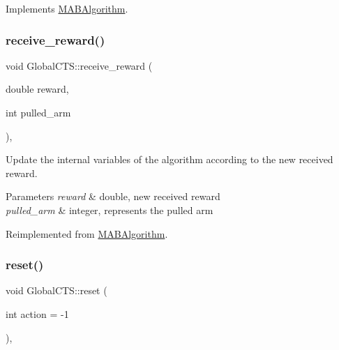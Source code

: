 Implements \mbox{\hyperlink{class_m_a_b_algorithm_afb48f01df0e1860d19759f6e20335007}{M\+A\+B\+Algorithm}}.

\mbox{\label{class_global_c_t_s_acb2f35fa8c6b2ae61912f6f337ed815f}} 
\subsubsection{\texorpdfstring{receive\+\_\+reward()}{receive\_reward()}}
{\footnotesize\ttfamily void Global\+C\+T\+S\+::receive\+\_\+reward (\begin{DoxyParamCaption}\item[{double}]{reward,  }\item[{int}]{pulled\+\_\+arm }\end{DoxyParamCaption})\hspace{0.3cm}{\ttfamily [override]}, {\ttfamily [virtual]}}



Update the internal variables of the algorithm according to the new received reward. 


\begin{DoxyParams}{Parameters}
{\em reward} & double, new received reward \\
\hline
{\em pulled\+\_\+arm} & integer, represents the pulled arm \\
\hline
\end{DoxyParams}


Reimplemented from \mbox{\hyperlink{class_m_a_b_algorithm_aa584b3d6b86fa050e3389be9781b5782}{M\+A\+B\+Algorithm}}.

\mbox{\label{class_global_c_t_s_a1e2c899b85ec7adf92a28ac758f556b5}} 
\subsubsection{\texorpdfstring{reset()}{reset()}}
{\footnotesize\ttfamily void Global\+C\+T\+S\+::reset (\begin{DoxyParamCaption}\item[{int}]{action = {\ttfamily -\/1} }\end{DoxyParamCaption})\hspace{0.3cm}{\ttfamily [override]}, {\ttfamily [virtual]}}



